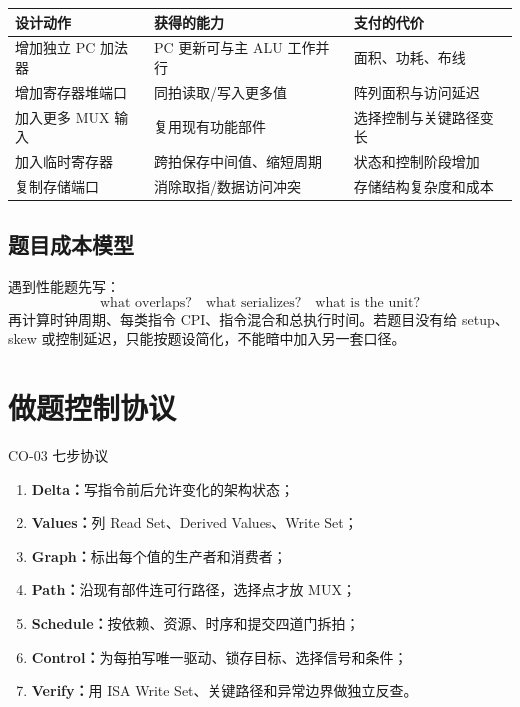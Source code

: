 \documentclass[UTF8,fontset=fandol,11pt,a4paper]{ctexart}
\newcommand{\kw}[1]{\textbf{\color{deep}#1}}
\begin{document}
\begin{center}
\small
\begin{tabularx}{\linewidth}{L{3.0cm}YY}
\toprule
设计动作 & 获得的能力 & 支付的代价 \\
\midrule
增加独立 PC 加法器 & PC 更新可与主 ALU 工作并行 & 面积、功耗、布线 \\
增加寄存器堆端口 & 同拍读取/写入更多值 & 阵列面积与访问延迟 \\
加入更多 MUX 输入 & 复用现有功能部件 & 选择控制与关键路径变长 \\
加入临时寄存器 & 跨拍保存中间值、缩短周期 & 状态和控制阶段增加 \\
复制存储端口 & 消除取指/数据访问冲突 & 存储结构复杂度和成本 \\
\bottomrule
\end{tabularx}
\end{center}

\subsection{题目成本模型}

遇到性能题先写：
\[
\text{what overlaps?}
\quad
\text{what serializes?}
\quad
\text{what is the unit?}
\]
再计算时钟周期、每类指令 CPI、指令混合和总执行时间。若题目没有给 setup、skew 或控制延迟，只能按题设简化，不能暗中加入另一套口径。

\section{做题控制协议}

\begin{corebox}{CO-03 七步协议}
\begin{enumerate}
  \item \kw{Delta：}写指令前后允许变化的架构状态；
  \item \kw{Values：}列 Read Set、Derived Values、Write Set；
  \item \kw{Graph：}标出每个值的生产者和消费者；
  \item \kw{Path：}沿现有部件连可行路径，选择点才放 MUX；
  \item \kw{Schedule：}按依赖、资源、时序和提交四道门拆拍；
  \item \kw{Control：}为每拍写唯一驱动、锁存目标、选择信号和条件；
  \item \kw{Verify：}用 ISA Write Set、关键路径和异常边界做独立反查。
\end{enumerate}
\end{corebox}
\end{document}
